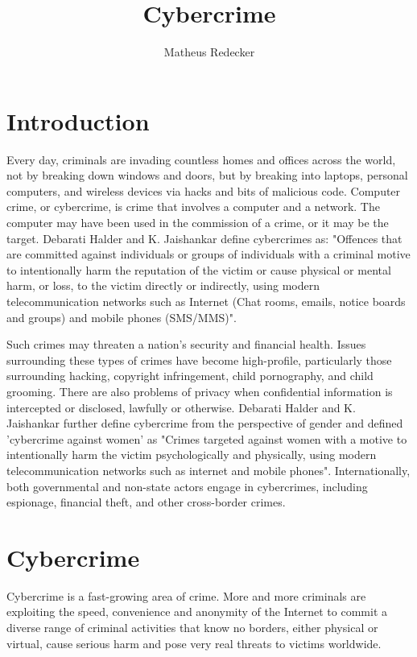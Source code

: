 \documentclass[12pt]{article}
\title{Cybercrime}
\author{Matheus Redecker\inst{1} }
\begin{document}
 

\maketitle

\section{Introduction}

Every day, criminals are invading countless homes and offices across the world, not by breaking down windows and doors, but by breaking into laptops, personal computers, and wireless devices via hacks and bits of malicious code. Computer crime, or cybercrime, is crime that involves a computer and a network. The computer may have been used in the commission of a crime, or it may be the target. Debarati Halder and K. Jaishankar define cybercrimes as: "Offences that are committed against individuals or groups of individuals with a criminal motive to intentionally harm the reputation of the victim or cause physical or mental harm, or loss, to the victim directly or indirectly, using modern telecommunication networks such as Internet (Chat rooms, emails, notice boards and groups) and mobile phones (SMS/MMS)".

Such crimes may threaten a nation's security and financial health. Issues surrounding these types of crimes have become high-profile, particularly those surrounding hacking, copyright infringement, child pornography, and child grooming. There are also problems of privacy when confidential information is intercepted or disclosed, lawfully or otherwise. Debarati Halder and K. Jaishankar further define cybercrime from the perspective of gender and defined 'cybercrime against women' as "Crimes targeted against women with a motive to intentionally harm the victim psychologically and physically, using modern telecommunication networks such as internet and mobile phones". Internationally, both governmental and non-state actors engage in cybercrimes, including espionage, financial theft, and other cross-border crimes. 

\section{Cybercrime}

Cybercrime is a fast-growing area of crime. More and more criminals are exploiting the speed, convenience and anonymity of the Internet to commit a diverse range of criminal activities that know no borders, either physical or virtual, cause serious harm and pose very real threats to victims worldwide.
\end{document}
